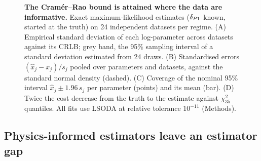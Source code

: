 \begin{figure}[tbp]
\centering
{}
\caption{\textbf{The Cram\'er--Rao bound is attained where the data are informative.} Exact maximum-likelihood
estimates ($\delta_{P1}$ known, started at the truth) on 24 independent datasets per
regime. (A) Empirical standard deviation of each log-parameter across datasets
against its CRLB; grey band, the 95\% sampling interval of a standard deviation
estimated from 24 draws. (B) Standardised errors $(\hat x_j-x_j)/s_j$ pooled
over parameters and datasets, against the standard normal density (dashed). (C)
Coverage of the nominal 95\% interval $\hat x_j\pm1.96\,s_j$ per parameter
(points) and its mean (bar). (D) Twice the cost decrease from the truth to the
estimate against $\chi^2_{35}$ quantiles. All fits use LSODA at relative
tolerance $10^{-11}$ (Methods).}
\label{fig:mc}
\end{figure}

\subsection{Physics-informed estimators leave an estimator gap}
\label{sec:res-gap}

